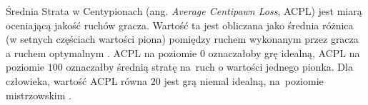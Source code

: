 Średnia Strata w Centypionach (ang. \emph{Average Centipawn Loss}, ACPL) jest miarą oceniającą jakość ruchów gracza.
Wartość ta jest obliczana jako średnia różnica (w setnych częściach wartości piona) pomiędzy ruchem wykonanym przez gracza a ruchem optymalnym \cite*{acpl}.
ACPL na poziomie $0$ oznaczałoby grę idealną, ACPL na poziomie $100$ oznaczałby średnią stratę na~ruch o wartości jednego pionka.
Dla człowieka, wartość ACPL równa $20$ jest grą niemal idealną, na~poziomie mistrzowskim \cite*{acpl-2}.

